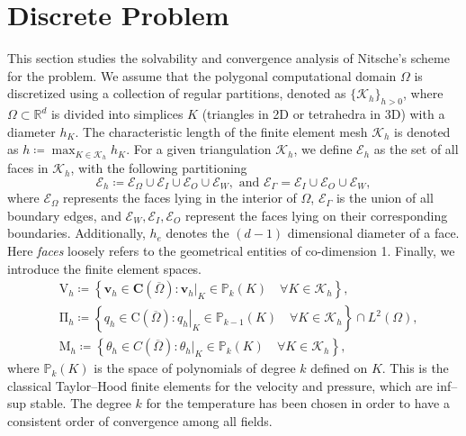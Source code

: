 \documentclass[10pt,a4paper]{article}
\begin{document}
  \section{Discrete Problem}\label{section2}
  \label{sec3}
  This section studies the solvability and convergence analysis of Nitsche's scheme for the problem. We assume that the polygonal computational domain ${\Omega}$ is discretized using a collection of regular partitions, denoted as $\{\mathcal{K}_h\}_{h>0}$, where $\Omega \subset \mathbb{R}^d$ is divided into simplices $K$ (triangles in 2D or tetrahedra in 3D) with a diameter $h_{{K}}$. The characteristic length of the finite element mesh $\mathcal{K}_h$ is denoted as $h \coloneqq \max _{{K} \in \mathcal{K}_h} h_{{K}}$. For a given triangulation $\mathcal{K}_h$, we define $\mathcal{E}_h$ as the set of all faces in $\mathcal{K}_h$, with the following partitioning
  		$$
  		\mathcal{E}_h \coloneqq \mathcal{E}_{\Omega} \cup \mathcal{E}_I \cup \mathcal{E}_O \cup \mathcal{E}_{W}, \text{ and } \mathcal{E}_{\Gamma} = \mathcal{E}_I \cup \mathcal{E}_O \cup \mathcal{E}_{W}, 
  		$$
  		where $\mathcal{E}_{\Omega}$ represents the faces lying in the interior of $\Omega$, $\mathcal{E}_{\Gamma}$ is the union of all boundary edges, and $\mathcal{E}_{W}, \mathcal{E}_{I}, \mathcal{E}_{O}$ represent the faces lying on their corresponding boundaries. Additionally, $h_e$ denotes the $(d-1)$ dimensional diameter of a face. Here \emph{faces} loosely refers to the geometrical entities of co-dimension 1. Finally, we introduce the finite element spaces. 
  		$$
  		\begin{aligned}
  		& \mathrm{V}_h \coloneqq \left\{\boldsymbol{v}_h \in \boldsymbol{C}(\overline{\Omega}) : \left.\boldsymbol{v}_h\right|_{K} \in \mathbb {P}_k({K}) \quad \forall {K} \in \mathcal{K}_h\right\}, \\
  		& \mathrm{\Pi}_h \coloneqq \left\{q_h \in \mathrm{C}(\overline{\Omega}) :\left.q_h\right|_{{K}} \in \mathbb {P}_{k-1}({K}) \quad \forall {K} \in \mathcal{K}_h\right\} \cap L^2(\Omega), 
        \\
        & \mathrm{M}_{h} \coloneqq \left\{\theta_h \in {C}(\overline{\Omega}) : \left.\theta_h\right|_{K} \in \mathbb {P}_k({K}) \quad \forall {K} \in \mathcal{K}_h\right\},
  		\end{aligned}
  		$$
  		where $\mathbb{P}_k(K)$ is the space of polynomials of degree $k$ defined on $K$. This is the classical Taylor–Hood finite elements for the velocity and pressure, which are inf–sup stable. The degree $k$ for the temperature has been chosen in order to have a consistent order of convergence among all fields.
\end{document}
